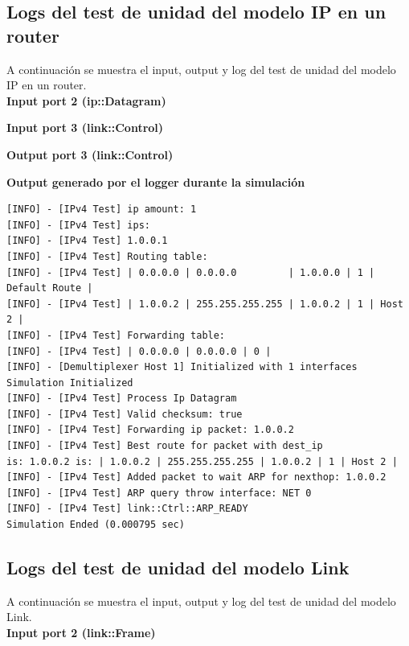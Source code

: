 \documentclass[10pt,a4paper]{article}
\begin{document}
\subsection{Logs del test de unidad del modelo IP en un router}
\label{appendix: ip_router unit test}
A continuación se muestra el input, output y log del test de unidad del modelo IP en un router.\\

\textbf{Input port 2 (ip::Datagram)}


\textbf{Input port 3 (link::Control)}


\textbf{Output port 3 (link::Control)}


\textbf{Output generado por el logger durante la simulación}
\begin{lstlisting}
[INFO] - [IPv4 Test] ip amount: 1
[INFO] - [IPv4 Test] ips:
[INFO] - [IPv4 Test] 1.0.0.1
[INFO] - [IPv4 Test] Routing table:
[INFO] - [IPv4 Test] | 0.0.0.0 | 0.0.0.0         | 1.0.0.0 | 1 | Default Route | 
[INFO] - [IPv4 Test] | 1.0.0.2 | 255.255.255.255 | 1.0.0.2 | 1 | Host 2 | 
[INFO] - [IPv4 Test] Forwarding table:
[INFO] - [IPv4 Test] | 0.0.0.0 | 0.0.0.0 | 0 | 
[INFO] - [Demultiplexer Host 1] Initialized with 1 interfaces
Simulation Initialized
[INFO] - [IPv4 Test] Process Ip Datagram
[INFO] - [IPv4 Test] Valid checksum: true
[INFO] - [IPv4 Test] Forwarding ip packet: 1.0.0.2
[INFO] - [IPv4 Test] Best route for packet with dest_ip 
is: 1.0.0.2 is: | 1.0.0.2 | 255.255.255.255 | 1.0.0.2 | 1 | Host 2 | 
[INFO] - [IPv4 Test] Added packet to wait ARP for nexthop: 1.0.0.2
[INFO] - [IPv4 Test] ARP query throw interface: NET 0
[INFO] - [IPv4 Test] link::Ctrl::ARP_READY
Simulation Ended (0.000795 sec)
\end{lstlisting}

\subsection{Logs del test de unidad del modelo Link}
\label{appendix: link unit test}
A continuación se muestra el input, output y log del test de unidad del modelo Link.\\

\textbf{Input port 2 (link::Frame)}

\end{document}
